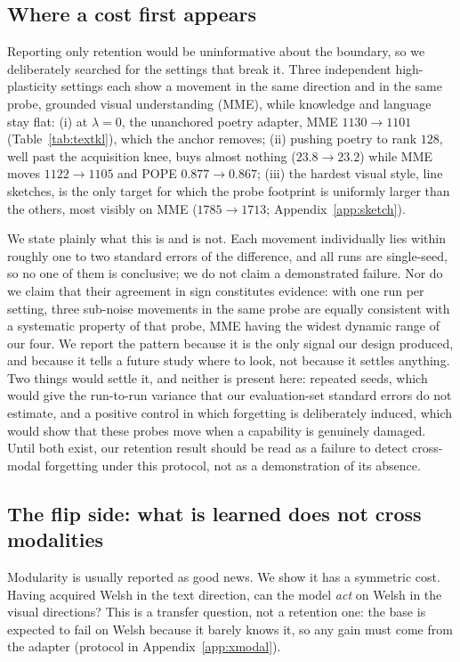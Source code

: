 \documentclass{article}
\begin{document}
\subsection{Where a cost first appears}
\label{sec:boundary}
Reporting only retention would be uninformative about the boundary, so we
deliberately searched for the settings that break it. Three independent
high-plasticity settings each show a movement in the same direction and in the
same probe, grounded visual understanding (MME), while knowledge and language
stay flat:
(i) at $\lambda=0$, the unanchored poetry adapter, MME $1130\to1101$
(Table~\ref{tab:textkl}), which the anchor removes;
(ii) pushing poetry to rank $128$, well past the acquisition knee, buys almost
nothing ($23.8\to23.2$) while MME moves $1122\to1105$ and POPE $0.877\to0.867$;
(iii) the hardest visual style, line sketches, is the only target for which the
probe footprint is uniformly larger than the others, most visibly on MME
($1785\to1713$; Appendix~\ref{app:sketch}).

We state plainly what this is and is not. Each movement individually lies within
roughly one to two standard errors of the difference, and all runs are
single-seed, so no one of them is conclusive; we do not claim a demonstrated
failure. Nor do we claim that their agreement in sign constitutes evidence: with
one run per setting, three sub-noise movements in the same probe are equally
consistent with a systematic property of that probe, MME having the widest
dynamic range of our four. We report the pattern because it is the only signal
our design produced, and because it tells a future study where to look, not
because it settles anything. Two things would settle it, and neither is present
here: repeated seeds, which would give the run-to-run variance that our
evaluation-set standard errors do not estimate, and a positive control in which
forgetting is deliberately induced, which would show that these probes move when
a capability is genuinely damaged. Until both exist, our retention result should
be read as a failure to detect cross-modal forgetting under this protocol, not as
a demonstration of its absence.

\subsection{The flip side: what is learned does not cross modalities}
Modularity is usually reported as good news. We show it has a symmetric cost.
Having acquired Welsh in the text direction, can the model \emph{act} on Welsh
in the visual directions? This is a transfer question, not a retention one: the
base is expected to fail on Welsh because it barely knows it, so any gain must
come from the adapter (protocol in Appendix~\ref{app:xmodal}).
\end{document}
